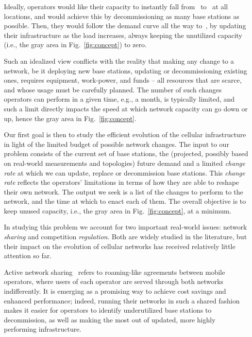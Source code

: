 \documentclass[10pt,journal,cspaper,compsoc]{IEEEtran}
\newcommand{\Fig}[1]{Fig.~\ref{fig:#1}}
\begin{document}
Ideally, operators would like their capacity to instantly fall from~ to~
at all locations, and would achieve this
by decommissioning as many base stations as possible.
Then, they would follow the demand curve all the way to~,
by updating their infrastructure as the load increases, always
keeping the unutilized capacity (i.e., the gray area in \Fig{concept}) to zero.

Such an idealized view conflicts with the reality that making any change to a network,
be it deploying new base stations, updating or decommissioning existing ones,
requires equipment, work-power, and funds -- all resources that are scarce, and whose usage must be carefully planned.
The number of such changes operators can perform in a given time, e.g., a month, is typically limited, and such a limit directly impacts the speed at which network capacity can go down or up, hence the gray area in \Fig{concept}.

Our first goal is then to study the efficient evolution of the cellular infrastructure in light of
the limited budget of possible network changes.
The input to our problem consists of the current set of base stations, the
(projected, possibly based on real-world measurements and topologies)
future demand and a limited {\em change rate} at which we can update, replace or decommission base stations.
This \emph{change rate} reflects the operators' limitations in terms of how they are able to reshape their
own network.
The output we seek is a list of the changes to perform to the network,
and the time at which to enact each of them.
The overall objective is to keep unused capacity, i.e., the gray area in \Fig{concept}, at a minimum.

In studying this problem we account for two important real-world issues: network {\em sharing} and competition {\em regulation}.
Both are widely studied in the literature, but their impact on the evolution of cellular networks has received
relatively little attention so far.

Active network sharing~\cite{leng2014,doyle2014} refers to roaming-like agreements between mobile operators, where users of each operator are served through both networks indifferently.
It is emerging as a promising way to achieve cost savings and enhanced performance; indeed, running their 
networks in such a shared fashion makes it easier for operators to identify underutilized base stations to 
decommission, as well as making the most out of updated, more highly performing infrastructure.
\end{document}
